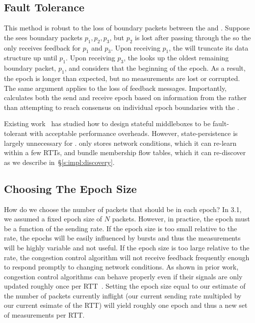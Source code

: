 \subsection{Fault Tolerance}
\label{s:measure:loss}
 This method is robust to the loss of boundary packets between the \inbox and \outbox.
Suppose the \inbox sees boundary packets $p_1, p_2, p_3$, but $p_2$ is lost after passing through
the \inbox so the \inbox only receives feedback for $p_1$ and $p_3$. Upon receiving $p_1$, 
the \inbox will truncate its data structure up until $p_1$. Upon receiving $p_3$, the \inbox 
looks up the oldest remaining boundary packet, $p_1$, and considers that the beginning of the epoch.
As a result, the epoch is longer than expected, but no measurements are lost or corrupted. 
The same argument applies to the loss of feedback messages. 
Importantly, \inbox calculates both the send and receive epoch based on information
from the \outbox rather than attempting to reach consensus on individual epoch boundaries with the \outbox. 

 Existing work~\cite{ftmb} has studied how to design stateful middleboxes to be fault-tolerant with acceptable performance overheads. 
However, state-persistence is largely unnecessary for \name.
\name only stores network conditions, which it can re-learn within a few RTTs, and bundle membership flow tables, which it can re-discover as we describe in~\S\ref{s:impl:discovery}. 

\subsection{Choosing The Epoch Size}
\label{s:measure:epoch}

How do we choose the number of packets that should be in each epoch?
In 3.1, we assumed a fixed epoch size of $N$ packets.
However, in practice, the epoch must be a function of the sending rate.
If the epoch size is too small relative to the rate,
the epochs will be easily influenced by bursts and thus the measurements will be highly variable
and not useful.
If the epoch size is too large relative to the rate, the congestion control algorithm will not
receive feedback frequently enough to respond promptly to changing network conditions. 
As shown in prior work, congestion control algorithms can behave properly even if their
signals are only updated roughly once per RTT~\cite{ccp-hotnets}.
Setting the epoch size equal to our estimate of the number of packets currently inflight 
(our current sending rate multipled by our current esimate of the RTT) will yield roughly
one epoch and thus a new set of measurements per RTT.

